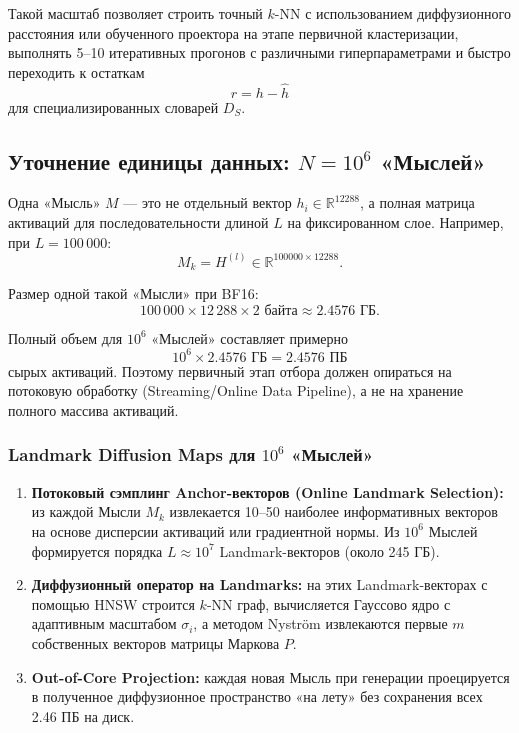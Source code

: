 \documentclass[11pt,a4paper]{article}
\begin{document}
Такой масштаб позволяет строить точный $k$-NN с использованием диффузионного расстояния или обученного проектора на этапе первичной кластеризации, выполнять 5--10 итеративных прогонов с различными гиперпараметрами и быстро переходить к остаткам
\[
r=h-\hat{h}
\]
для специализированных словарей $D_S$.

\subsection*{Уточнение единицы данных: $N=10^6$ «Мыслей»}

Одна «Мысль» $M$ — это не отдельный вектор $h_i\in\mathbb{R}^{12288}$, а полная матрица активаций для последовательности длиной $L$ на фиксированном слое. Например, при $L=100\,000$:
\[
M_k=H^{(l)}\in\mathbb{R}^{100000\times12288}.
\]

Размер одной такой «Мысли» при BF16:
\[
100\,000\times12\,288\times2\text{ байта}\approx2.4576\text{ ГБ}.
\]

Полный объем для $10^6$ «Мыслей» составляет примерно
\[
10^6\times2.4576\text{ ГБ}=2.4576\text{ ПБ}
\]
сырых активаций. Поэтому первичный этап отбора должен опираться на потоковую обработку (Streaming/Online Data Pipeline), а не на хранение полного массива активаций.

\subsubsection*{Landmark Diffusion Maps для $10^6$ «Мыслей»}

\begin{enumerate}
    \item \textbf{Потоковый сэмплинг Anchor-векторов (Online Landmark Selection):} из каждой Мысли $M_k$ извлекается 10--50 наиболее информативных векторов на основе дисперсии активаций или градиентной нормы. Из $10^6$ Мыслей формируется порядка $L\approx10^7$ Landmark-векторов (около 245 ГБ).
    \item \textbf{Диффузионный оператор на Landmarks:} на этих Landmark-векторах с помощью HNSW строится $k$-NN граф, вычисляется Гауссово ядро с адаптивным масштабом $\sigma_i$, а методом Nyström извлекаются первые $m$ собственных векторов матрицы Маркова $P$.
    \item \textbf{Out-of-Core Projection:} каждая новая Мысль при генерации проецируется в полученное диффузионное пространство «на лету» без сохранения всех 2.46 ПБ на диск.
\end{enumerate}
\end{document}
